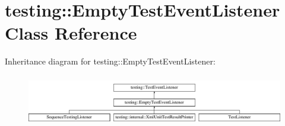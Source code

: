 \hypertarget{classtesting_1_1_empty_test_event_listener}{}\section{testing\+:\+:Empty\+Test\+Event\+Listener Class Reference}
\label{classtesting_1_1_empty_test_event_listener}
Inheritance diagram for testing\+:\+:Empty\+Test\+Event\+Listener\+:\begin{figure}[H]
\begin{center}
\leavevmode
\includegraphics[height=2.267207cm]{classtesting_1_1_empty_test_event_listener}
\end{center}
\end{figure}
